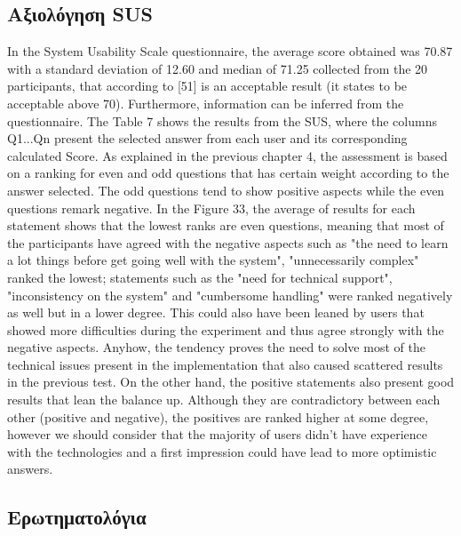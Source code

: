 \subsection{Αξιολόγηση SUS}
In the System Usability Scale questionnaire, the average score obtained was 70.87 with a standard deviation of 12.60 and median of 71.25 collected from the 20 participants, that according to [51] is an acceptable result (it states to be acceptable above 70). Furthermore, information can be inferred from the questionnaire. The Table 7 shows the results from the SUS, where the columns Q1...Qn present the selected answer from each user and its corresponding calculated Score. As explained in the previous chapter 4, the assessment is based on a ranking for even and odd questions that has certain weight according to the answer selected. The odd questions tend to show positive aspects while the even questions remark negative. In the Figure 33, the average of results for each statement shows that the lowest ranks are even questions, meaning that most of the participants have agreed with the negative aspects such as "the need to learn a lot things before get going well with the system", "unnecessarily complex" ranked the lowest; statements such as the "need for technical support", "inconsistency on the system" and "cumbersome handling" were ranked negatively as well but in a lower degree. This could also have been leaned by users that showed more difficulties during the experiment and thus agree strongly with the negative aspects. Anyhow, the tendency proves the need to solve most of the technical issues present in the implementation that also caused scattered results in the previous test. On the other hand, the positive statements also present good results that lean the balance up. Although they are contradictory between each other (positive and negative), the positives are ranked higher at some degree, however we should consider that the majority of users didn’t have experience with the technologies and a first impression could have lead to more optimistic answers.

\subsection{Ερωτηματολόγια}

